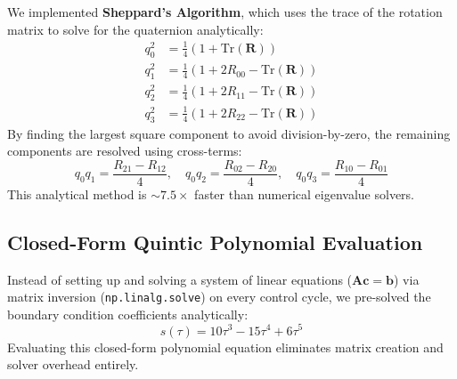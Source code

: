 \documentclass[11pt,a4paper]{article}
\begin{document}
We implemented \textbf{Sheppard's Algorithm}, which uses the trace of the rotation matrix to solve for the quaternion analytically:
\begin{align}
q_0^2 &= \frac{1}{4}(1 + \text{Tr}(\mathbf{R})) \\
q_1^2 &= \frac{1}{4}(1 + 2R_{00} - \text{Tr}(\mathbf{R})) \\
q_2^2 &= \frac{1}{4}(1 + 2R_{11} - \text{Tr}(\mathbf{R})) \\
q_3^2 &= \frac{1}{4}(1 + 2R_{22} - \text{Tr}(\mathbf{R}))
\end{align}
By finding the largest square component to avoid division-by-zero, the remaining components are resolved using cross-terms:
\begin{equation}
q_0 q_1 = \frac{R_{21} - R_{12}}{4}, \quad q_0 q_2 = \frac{R_{02} - R_{20}}{4}, \quad q_0 q_3 = \frac{R_{10} - R_{01}}{4}
\end{equation}
This analytical method is $\sim 7.5\times$ faster than numerical eigenvalue solvers.

\subsection{Closed-Form Quintic Polynomial Evaluation}
Instead of setting up and solving a system of linear equations ($\mathbf{A} \mathbf{c} = \mathbf{b}$) via matrix inversion (\texttt{np.linalg.solve}) on every control cycle, we pre-solved the boundary condition coefficients analytically:
\begin{equation}
s(\tau) = 10\tau^3 - 15\tau^4 + 6\tau^5
\end{equation}
Evaluating this closed-form polynomial equation eliminates matrix creation and solver overhead entirely.
\end{document}
